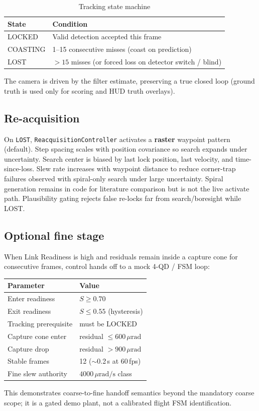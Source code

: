 \documentclass[11pt,a4paper]{article}
\begin{document}
\begin{table}[H]
\centering
\caption{Tracking state machine}
\label{tab:states}
\begin{tabular}{@{}ll@{}}
\toprule
\textbf{State} & \textbf{Condition} \\
\midrule
LOCKED & Valid detection accepted this frame \\
COASTING & 1--15 consecutive misses (coast on prediction) \\
LOST & $>15$ misses (or forced loss on detector switch / blind) \\
\bottomrule
\end{tabular}
\end{table}
\noindent
The camera is driven by the filter estimate, preserving a true closed loop (ground truth is used only for scoring and HUD truth overlays).

\subsection{Re-acquisition}
On \texttt{LOST}, \texttt{ReacquisitionController} activates a \textbf{raster} waypoint pattern (default).
Step spacing scales with position covariance so search expands under uncertainty.
Search center is biased by last lock position, last velocity, and time-since-loss.
Slew rate increases with waypoint distance to reduce corner-trap failures observed with spiral-only search under large uncertainty.
Spiral generation remains in code for literature comparison but is not the live activate path.
Plausibility gating rejects false re-locks far from search/boresight while LOST.

\subsection{Optional fine stage}
When Link Readiness is high and residuals remain inside a capture cone for consecutive frames, control hands off to a mock 4-QD / FSM loop:
\begin{center}
\small
\begin{tabular}{@{}ll@{}}
\toprule
Parameter & Value \\
\midrule
Enter readiness & $S\ge 0.70$ \\
Exit readiness & $S\le 0.55$ (hysteresis) \\
Tracking prerequisite & must be LOCKED \\
Capture cone enter & residual $\le 600\,\mu\mathrm{rad}$ \\
Capture drop & residual $>900\,\mu\mathrm{rad}$ \\
Stable frames & 12 ($\sim$0.2\,s at 60\,fps) \\
Fine slew authority & $4000\,\mu\mathrm{rad/s}$ class \\
\bottomrule
\end{tabular}
\end{center}
This demonstrates coarse-to-fine handoff semantics beyond the mandatory coarse scope; it is a gated demo plant, not a calibrated flight FSM identification.
\end{document}
